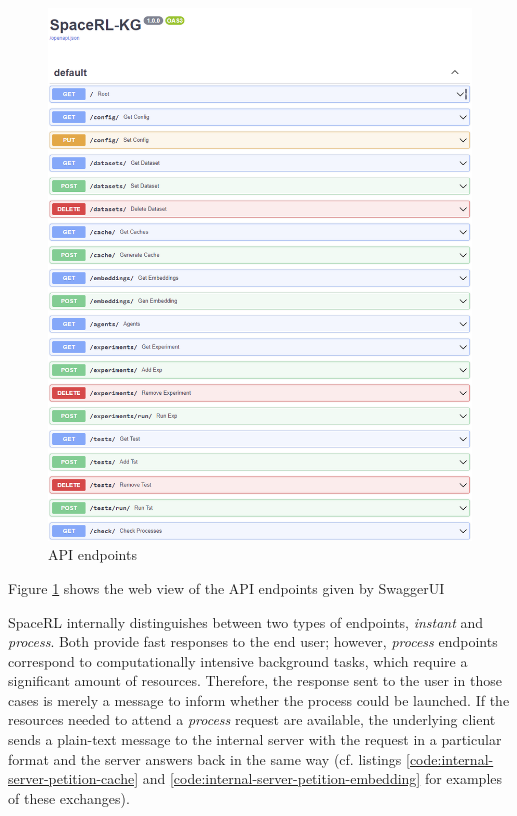 \begin{figure}[!h]
    \centering
    \includegraphics[width=.8\textwidth]{fig/framework/API/api_docs.png}
    \caption{API endpoints}
    \label{fig:endpoints}
\end{figure}

Figure \ref{fig:endpoints} shows the web view of the API endpoints given by SwaggerUI 

SpaceRL internally distinguishes  between two types of endpoints, \emph{instant} and \emph{process}. Both provide fast responses to the end user; however, \emph{process} endpoints correspond to computationally intensive background tasks, which require a significant amount of resources. Therefore, the response sent to the user in those cases is merely a message to inform whether the process could be launched. If the resources needed to attend a \emph{process} request are available, the  underlying client sends a plain-text message to the internal server with the request in a particular format and the server answers back in the same way (cf. listings \ref{code:internal-server-petition-cache} and \ref{code:internal-server-petition-embedding} for examples of these exchanges). 



